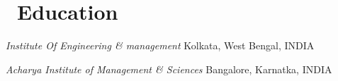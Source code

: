 \section{\faGraduationCap\ Education}

\textit{Institute Of Engineering \& management} Kolkata, West Bengal, INDIA

\textit{Acharya Institute of Management \& Sciences} Bangalore, Karnatka, INDIA

